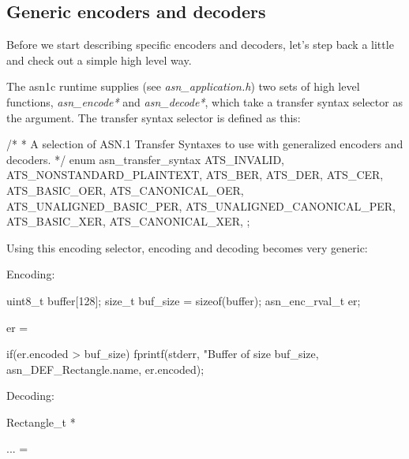 \documentclass[english,oneside,12pt]{book}
\begin{document}
\subsection{\label{sub:Generic-Encoding}Generic encoders and decoders}

Before we start describing specific encoders and decoders, let's step back
a little and check out a simple high level way.

The asn1c runtime supplies (see \emph{asn\_application.h}) two sets of high level functions, \emph{asn\_encode*} and \emph{asn\_decode*}, which take a transfer syntax selector as the argument. The transfer syntax selector is defined as this:

\begin{codesample}[basicstyle=\scriptsize\listingfont]
/*
 * A selection of ASN.1 Transfer Syntaxes to use with generalized encoders and decoders.
 */
enum asn_transfer_syntax {
    ATS_INVALID,
    ATS_NONSTANDARD_PLAINTEXT,
    ATS_BER,
    ATS_DER,
    ATS_CER,
    ATS_BASIC_OER,
    ATS_CANONICAL_OER,
    ATS_UNALIGNED_BASIC_PER,
    ATS_UNALIGNED_CANONICAL_PER,
    ATS_BASIC_XER,
    ATS_CANONICAL_XER,
};
\end{codesample}

Using this encoding selector, encoding and decoding becomes very generic:

\noindent{}Encoding:

\begin{codesample}[basicstyle=\scriptsize\listingfont]
uint8_t buffer[128];
size_t buf_size = sizeof(buffer);
asn_enc_rval_t er;

er = %

if(er.encoded > buf_size) {
    fprintf(stderr, "Buffer of size %
        buf_size, asn_DEF_Rectangle.name, er.encoded);
}
\end{codesample}

\noindent{}Decoding:

\begin{codesample}[basicstyle=\scriptsize\listingfont]
Rectangle_t *%

... = %
\end{codesample}
\end{document}
